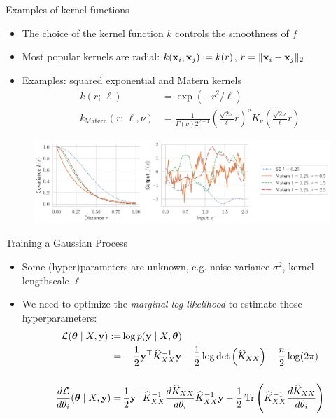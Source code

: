 \documentclass{beamer}
\begin{document}
\begin{frame}{Examples of kernel functions}
\begin{itemize}[<+->]
    \item The choice of the kernel function $k$ controls the smoothness of $f$
    \item Most popular kernels are radial: $k(\boldsymbol{\mathbf{x}}_i, \boldsymbol{\mathbf{x}}_j) := k(r)$, $r = \Vert \boldsymbol{\mathbf{x}}_i - \boldsymbol{\mathbf{x}}_j \Vert_2$
    \item Examples: squared exponential and Matern kernels
    {\small \begin{align*}
        k(r; \, \ell) &= \exp(-r^2 / \ell) \\
        k_{\text{Matern}}(r ; \, \ell, \nu) &= \frac{1}{\Gamma(\nu) 2^{\nu - 1}} \left( \frac{\sqrt{2\nu}}{\ell} r \right)^\nu K_\nu \left( \frac{\sqrt{2\nu}}{\ell} r \right)
    \end{align*}}
\end{itemize}
\begin{figure}
    \centering
    \includegraphics[width=\textwidth]{res/covariance_overview.pdf}
    \label{fig:my_label}
\end{figure}
\end{frame}

\begin{frame}{Training a Gaussian Process}
\begin{itemize}[<+->]
    \item Some (hyper)parameters are unknown, e.g. noise variance $\sigma^2$, kernel lengthscale $\ell$
    \item We need to optimize the \emph{marginal log likelihood} to estimate those hyperparameters:
    {\small \begin{align*}
        \mathcal L(\boldsymbol{\mathbf{\theta}} \mid X, \boldsymbol{\mathbf{y}}) 
    :=& \log p(\boldsymbol{\mathbf{y}} \mid X, \boldsymbol{\mathbf{\theta}}) \nonumber\\
    =& - \frac 1 2 \boldsymbol{\mathbf{y}}^\top \widehat K_{XX}^{-1} \boldsymbol{\mathbf{y}} - \frac 1 2 \log \det \left( \widehat K_{XX} \right) - \frac n 2 \log(2\pi) \label{eq:marginal_log_likelihood}\\[0.5cm]
    \frac{d \mathcal L}{d \theta_i} (\boldsymbol{\mathbf{\theta}} \mid X, \boldsymbol{\mathbf{y}}) 
    =& \, \frac 1 2 \boldsymbol{\mathbf{y}}^\top \widehat K_{XX}^{-1} \frac{d \widehat K_{XX}}{d\theta_i} \widehat K_{XX}^{-1} \boldsymbol{\mathbf{y}} - \frac 1 2 \operatorname{Tr} \left( \widehat K_{XX}^{-1} \frac{d \widehat K_{XX}}{d\theta_i} \right)
    \end{align*}}
\end{itemize}
\end{frame}
\end{document}
